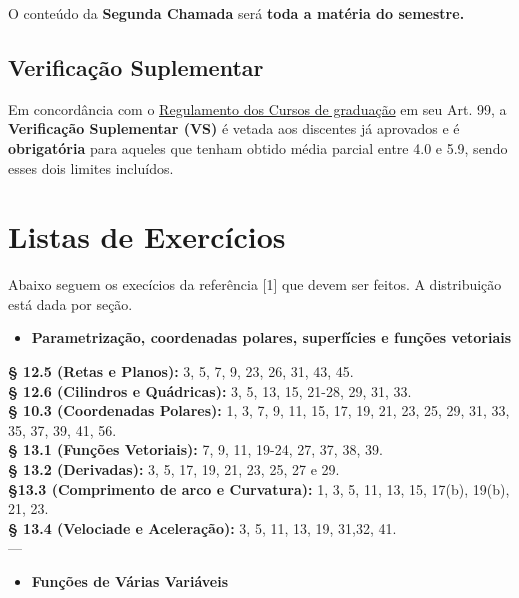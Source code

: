 \documentclass[
  letterpaper,
  DIV=11,
  numbers=noendperiod]{scrartcl}
\providecommand{\tightlist}{%
  \setlength{\itemsep}{0pt}\setlength{\parskip}{0pt}}
\begin{document}
O conteúdo da \textbf{Segunda Chamada} será \textbf{toda a matéria do
semestre.}

\subsection*{Verificação
Suplementar}\label{verificauxe7uxe3o-suplementar}

Em concordância com o
\href{http://www.uff.br/sites/default/files/001-2015_regulamento_do_curso_de_graduacao_0.pdf\#page=55}{Regulamento
dos Cursos de graduação} em seu Art. 99, a \textbf{Verificação
Suplementar (VS)} é vetada aos discentes já aprovados e é
\textbf{obrigatória} para aqueles que tenham obtido média parcial entre
4.0 e 5.9, sendo esses dois limites incluídos.

\section{Listas de Exercícios}\label{listas-de-exercuxedcios}

Abaixo seguem os execícios da referência {[}1{]} que devem ser feitos. A
distribuição está dada por seção.

\begin{itemize}
\tightlist
\item
  \textbf{Parametrização, coordenadas polares, superfícies e funções
  vetoriais}\\
\end{itemize}

\textbf{§ 12.5 (Retas e Planos):} 3, 5, 7, 9, 23, 26, 31, 43, 45.\\
\textbf{§ 12.6 (Cilindros e Quádricas):} 3, 5, 13, 15, 21-28, 29, 31,
33.\\
\textbf{§ 10.3 (Coordenadas Polares):} 1, 3, 7, 9, 11, 15, 17, 19, 21,
23, 25, 29, 31, 33, 35, 37, 39, 41, 56.\\
\textbf{§ 13.1 (Funções Vetoriais):} 7, 9, 11, 19-24, 27, 37, 38, 39.\\
\textbf{§ 13.2 (Derivadas):} 3, 5, 17, 19, 21, 23, 25, 27 e 29.\\
\textbf{§13.3 (Comprimento de arco e Curvatura):} 1, 3, 5, 11, 13, 15,
17(b), 19(b), 21, 23.\\
\textbf{§ 13.4 (Velociade e Aceleração):} 3, 5, 11, 13, 19, 31,32, 41.\\
---

\begin{itemize}
\tightlist
\item
  \textbf{Funções de Várias Variáveis}\\
\end{itemize}
\end{document}
